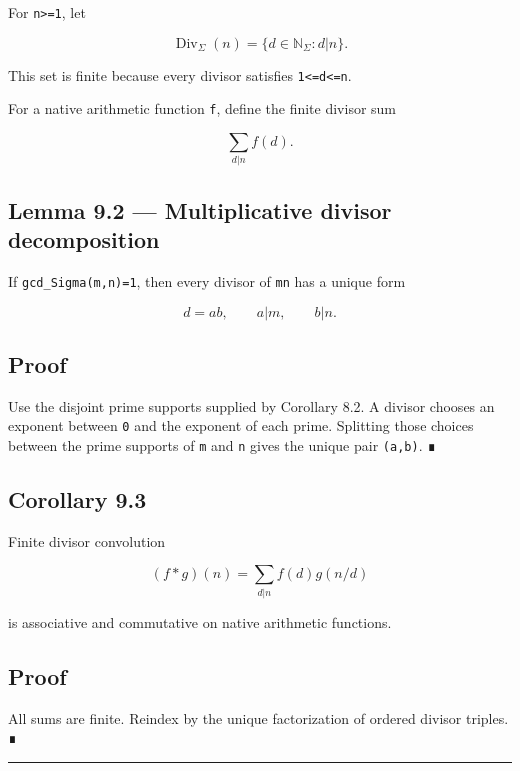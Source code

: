 For \texttt{n\textgreater{}=1}, let

\[
\operatorname{Div}_\Sigma(n)
=
\{d\in\mathbb N_\Sigma:d|n\}.
\]

This set is finite because every divisor satisfies \texttt{1\textless{}=d\textless{}=n}.

For a native arithmetic function \texttt{f}, define the finite divisor sum

\[
\sum_{d|n}f(d).
\]

\hypertarget{lemma-9.2-multiplicative-divisor-decomposition}{%
\subsection{Lemma 9.2 --- Multiplicative divisor decomposition}\label{lemma-9.2-multiplicative-divisor-decomposition}}

If \texttt{gcd\_Sigma(m,n)=1}, then every divisor of \texttt{mn} has a unique form

\[
d=ab,
\qquad a|m,
\qquad b|n.
\]

\hypertarget{proof-10}{%
\subsection{Proof}\label{proof-10}}

Use the disjoint prime supports supplied by Corollary 8.2. A divisor chooses an
exponent between \texttt{0} and the exponent of each prime. Splitting those choices
between the prime supports of \texttt{m} and \texttt{n} gives the unique pair \texttt{(a,b)}. ∎

\hypertarget{corollary-9.3}{%
\subsection{Corollary 9.3}\label{corollary-9.3}}

Finite divisor convolution

\[
(f*g)(n)=\sum_{d|n}f(d)g(n/d)
\]

is associative and commutative on native arithmetic functions.

\hypertarget{proof-11}{%
\subsection{Proof}\label{proof-11}}

All sums are finite. Reindex by the unique factorization of ordered divisor
triples. ∎

\begin{center}\rule{0.5\linewidth}{0.5pt}\end{center}

